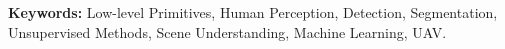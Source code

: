 %
%


%

\vspace*{\fill}

\textbf{Keywords:} Low-level Primitives, Human Perception, Detection, Segmentation, Unsupervised Methods, Scene Understanding, Machine Learning, UAV.